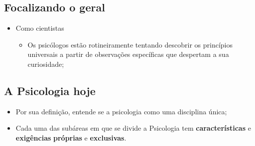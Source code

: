 \documentclass[
]{book}
\providecommand{\tightlist}{%
  \setlength{\itemsep}{0pt}\setlength{\parskip}{0pt}}
\begin{document}
\hypertarget{focalizando-o-geral-1}{%
\subsection{Focalizando o geral}\label{focalizando-o-geral-1}}

\begin{itemize}
\tightlist
\item
  Como cientistas

  \begin{itemize}
  \tightlist
  \item
    Os psicólogos estão rotineiramente tentando descobrir os princípios universais a partir de observações específicas que despertam a sua curiosidade;
  \end{itemize}
\end{itemize}

\hypertarget{a-psicologia-hoje-1}{%
\subsection{A Psicologia hoje}\label{a-psicologia-hoje-1}}

\begin{itemize}
\tightlist
\item
  Por sua definição, entende se a psicologia como uma disciplina única;
\item
  Cada uma das subáreas em que se divide a Psicologia tem \textbf{características} e \textbf{exigências} \textbf{próprias} e \textbf{exclusivas}.
\end{itemize}
\end{document}
